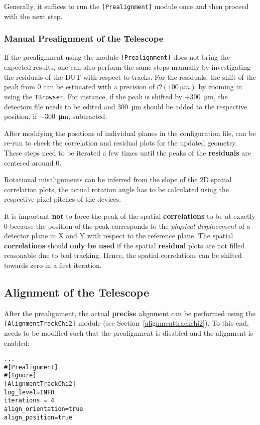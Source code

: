 Generally, it suffices to run the \texttt{[Prealignment]} module once and then proceed with the next step.

\subsubsection*{Manual Prealignment of the Telescope}
If the prealignment using the module \texttt{[Prealignment]} does not bring the expected results, one can also perform the same steps manually by investigating the residuals of the DUT with respect to tracks.
For the residuals, the shift of the peak from 0 can be estimated with a precision of $\mathcal{O}(\SI{100}{\micro m})$ by zooming in using the \texttt{TBrowser}.
For instance, if the peak is shifted by +\SI{+300}{\micro m}, the detectors file needs to be edited and \SI{+300}{\micro m} should be added to the respective position, if \SI{-300}{\micro m}, subtracted.

After modifying the positions of individual planes in the configuration file, \corry can be re-run to check the correlation and residual plots for the updated geometry.
These steps need to be iterated a few times until the peaks of the \textbf{residuals} are centered around 0.

Rotational misalignments can be inferred from the slope of the 2D spatial correlation plots, the actual rotation angle has to be calculated using the respective pixel pitches of the devices.

\begin{warning}
It is important \textbf{not} to force the peak of the spatial \textbf{correlations} to be at exactly 0 because the position of the peak corresponds to the \textit{physical displacement} of a detector plane in X and Y with respect to the reference plane.
The spatial \textbf{correlations} should \textbf{only be used} if the spatial \textbf{residual} plots are not filled reasonable due to bad tracking.
Hence, the spatial correlations can be shifted towards zero in a first iteration.
\end{warning}


\subsection*{Alignment of the Telescope}
After the prealignment, the actual \textbf{precise} alignment can be performed using the \texttt{[AlignmentTrackChi2]} module (see Section~\ref{alignmenttrackchi2}).
To this end,  needs to be modified such that the prealignment is disabled and the alignment is enabled:
\begin{verbatim}
...
#[Prealignment]
#[Ignore]
[AlignmentTrackChi2]
log_level=INFO
iterations = 4
align_orientation=true
align_position=true
\end{verbatim}

